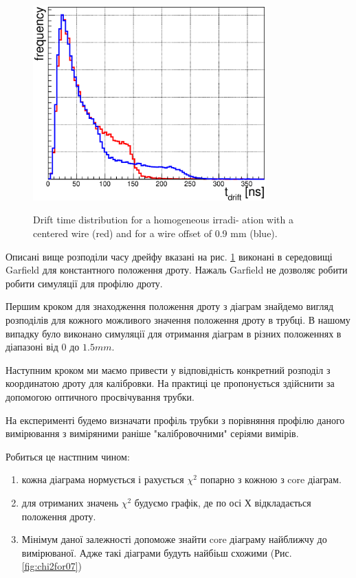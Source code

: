 \documentclass[]{article}
\begin{document}
	\begin{figure}[h]
	\centering
	\includegraphics[width=0.8\textwidth]{00_09_driftTimeDistr}
	\label{fig:DrftTimeDistr_00_09_comp}
	\caption{Drift time distribution for a homogeneous irradi-
ation with a centered wire (red) and for a wire offset of 0.9 mm (blue).}
	\end{figure}
	
	Описані вище розподіли часу дрейфу вказані на рис. \ref{fig:DrftTimeDistr_00_09_comp} виконані в середовищі Garfield для константного положення дроту. Нажаль Garfield не дозволяє робити робити симуляції для  профілю дроту.

	Першим кроком для знаходження положення дроту з діаграм знайдемо вигляд розподілів для кожного можливого значення положення дроту в трубці. В нашому випадку було виконано симуляції для отримання діаграм в різних положеннях в діапазоні від $0$ до $1.5 mm$.

	Наступним кроком ми маємо привести у відповідність конкретний розподіл з координатою дроту для калібровки. На практиці це пропонується здійснити за допомогою оптичного просвічування трубки.
	
	На експерименті будемо визначати профіль трубки з порівняння профілю даного вимірювання з виміряними раніше "калібровочними" серіями вимірів.
	
	Робиться це настпним чином:
	\begin{enumerate}
		\item кожна діаграма нормується і рахується $\chi^2$ попарно з кожною з core діаграм. 
		\item для отриманих значень $\chi^2$ будуємо графік, де по осі Х відкладається положення дроту.
		\item Мінімум даної залежності допоможе знайти core діаграму найближчу до вимірюваної. Адже такі діаграми будуть найбіьш схожими (Рис. \ref{fig:chi2for07})
	\end{enumerate}
	
\end{document}

